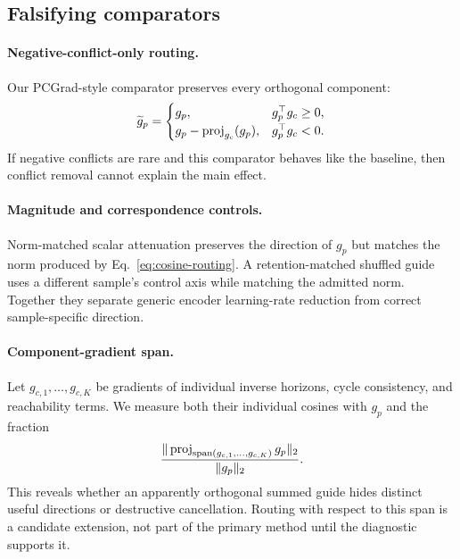\subsection{Falsifying comparators}

\paragraph{Negative-conflict-only routing.}
Our PCGrad-style comparator preserves every orthogonal component:
\begin{equation}
\label{eq:pcgrad-comparator}
\widetilde g_p=
\begin{cases}
g_p,&g_p^\top g_c\geq0,\\
g_p-\operatorname{proj}_{g_c}(g_p),&g_p^\top g_c<0.
\end{cases}
\end{equation}
If negative conflicts are rare and this comparator behaves like the baseline,
then conflict removal cannot explain the main effect.

\paragraph{Magnitude and correspondence controls.}
Norm-matched scalar attenuation preserves the direction of $g_p$ but matches
the norm produced by Eq.~\ref{eq:cosine-routing}.  A retention-matched shuffled
guide uses a different sample's control axis while matching the admitted norm.
Together they separate generic encoder learning-rate reduction from correct
sample-specific direction.

\paragraph{Component-gradient span.}
Let $g_{c,1},\ldots,g_{c,K}$ be gradients of individual inverse horizons,
cycle consistency, and reachability terms.  We measure both their individual
cosines with $g_p$ and the fraction
\begin{equation}
    \frac{\|\operatorname{proj}_{\mathrm{span}(g_{c,1},\ldots,g_{c,K})}g_p\|_2}
    {\|g_p\|_2}.
\end{equation}
This reveals whether an apparently orthogonal summed guide hides distinct
useful directions or destructive cancellation.  Routing with respect to this
span is a candidate extension, not part of the primary method until the
diagnostic supports it.
